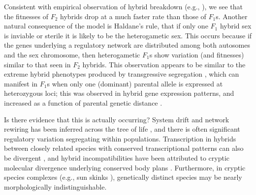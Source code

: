 \documentclass{article}
\newcommand{\1}{\mathbbm{1}}
\begin{document}
Consistent with empirical observation of hybrid breakdown (e.g., \citet{plotner2017chlorosis}), 
we see that the fitnesses of $F_2$ hybrids drop at a much faster rate than those of $F_1$s.
Another natural consequence of the model is Haldane's rule,
that if only one $F_1$ hybrid sex is inviable or sterile it is likely to be the heterogametic sex.
This occurs because if the genes underlying a regulatory network are distributed among both autosomes and the sex chromosome, 
then heterogametic $F_1$s show variation (and fitnesses) similar to that seen in $F_2$ hybrids.
This observation appears to be similar to the extreme hybrid phenotypes produced by transgressive segregation \citep{rieseberg1999transgressive}, 
which can manifest in $F_1$s when only one (dominant) parental allele is expressed at heterozygous loci; this was observed in hybrid gene expression patterns, and increased as a function of parental genetic distance \citep{stelkens2009genetic}.

Is there evidence that this is actually occurring?
System drift and network rewiring has been inferred across the tree of life \citep{wotton2015quantitative, crombach2016gap, dalal2017transcription, johnson2017rewiring, ali2017quantitative},
and there is often significant regulatory variation segregating within populations.
Transcription in hybrids between closely related species with conserved transcriptional patterns can also be divergent 
\citep{haerty2006gene, maheshwari2012cis, coolon2014tempo, michalak2004association, mack2016gene}, and hybrid incompatibilities have been attributed to cryptic molecular divergence underlying conserved body plans \citep{gavin2013embryonic}. 
Furthermore, in cryptic species complexes (e.g., sun skinks \citep{barley2013challenge}),
genetically distinct species
may be nearly morphologically indistinguishable.
\end{document}
